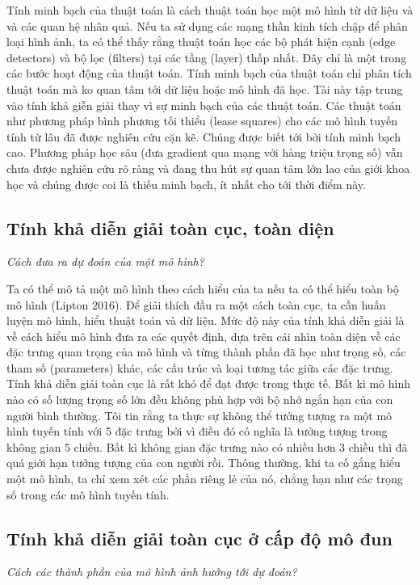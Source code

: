 Tính minh bạch của thuật toán là cách thuật toán học một mô hình từ dữ liệu và và các quan hệ nhân quả. Nếu ta sử dụng các mạng thần kinh tích chập để phân loại hình ảnh, ta có thể thấy rằng thuật toán học các bộ phát hiện cạnh (edge detectors) và bộ lọc (filters) tại các tầng (layer) thấp nhất. Đây chỉ là một trong các bước hoạt động của thuật toán. Tính minh bạch của thuật toán chỉ phân tích thuật toán mà ko quan tâm tới dữ liệu hoặc mô hình đã học. Tài này tập trung vào tính khả giễn giải thay vì sự minh bạch của các thuật toán. Các thuật toán như phương pháp bình phương tối thiểu (lease squares) cho các mô hình tuyến tính từ lâu đã được nghiên cứu cặn kẽ. Chúng được biết tới bởi tính minh bạch cao. Phương pháp học sâu (đưa gradient qua mạng với hàng triệu trọng số) vẫn chưa được nghiên cứu rõ ràng và đang thu hút sự quan tâm lớn lao của giới khoa học và chúng được coi là thiếu minh bạch, ít nhất cho tới thời điểm này.

\subsection{Tính khả diễn giải toàn cục, toàn diện}
\textit{Cách đưa ra dự đoán của một mô hình?}

Ta có thể mô tả một mô hình theo cách hiểu của ta nếu ta có thể hiểu toàn bộ mô hình (Lipton 2016). Để giải thích đầu ra một cách toàn cục, ta cần huấn luyện mô hình, hiểu thuật toán và dữ liệu. Mức độ này của tính khả diễn giải là về cách hiểu mô hình đưa ra các quyết định, dựa trên cái nhìn toàn diện về các đặc trưng quan trọng của mô hình và từng thành phần đã học như trọng số, các tham số (parameters) khác, các cấu trúc và loại tương tác giữa các đặc trưng. Tính khả diễn giải toàn cục là rất khó để đạt được trong thực tế. Bất kì mô hình nào có số lượng trọng số lớn đều không phù hợp với bộ nhớ ngắn hạn của con người bình thường. Tôi tin rằng ta thực sự không thể tưởng tượng ra một mô hình tuyến tính với 5 đặc trưng bởi vì điều đó có nghĩa là tưởng tượng trong không gian 5 chiều. Bất kì không gian đặc trưng nào có nhiều hơn 3 chiều thì đã quá giới hạn tưởng tượng của con người rồi. Thông thường, khi ta cố gắng hiểu một mô hình, ta chỉ xem xét các phần riêng lẻ của nó, chẳng hạn như các trọng số trong các mô hình tuyến tính.

\subsection{Tính khả diễn giải toàn cục ở cấp độ mô đun}
\textit{Cách các thành phần của mô hình ảnh hưởng tới dự đoán?}

